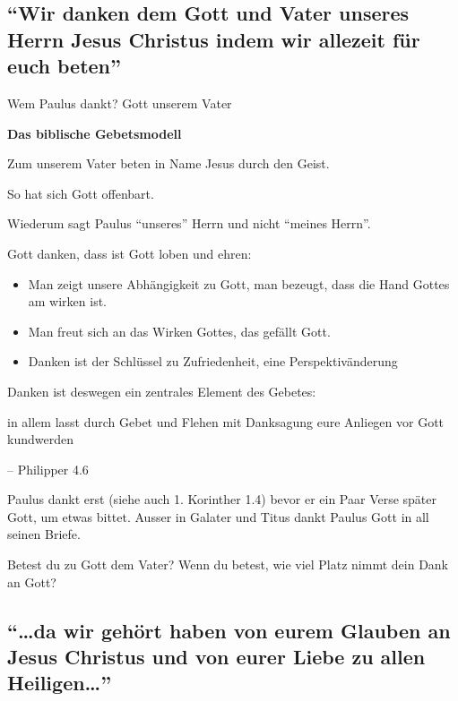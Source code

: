 \documentclass[
  12pt,
]{krantz}
\makeatletter
\providecommand{\tightlist}{%
  \setlength{\itemsep}{0pt}\setlength{\parskip}{0pt}}
\newenvironment{kframe}{%
\medskip{}
\setlength{\fboxsep}{.8em}
 \def\at@end@of@kframe{}%
 \ifinner\ifhmode%
  \def\at@end@of@kframe{\end{minipage}}%
  \begin{minipage}{\columnwidth}%
 \fi\fi%
 \def\FrameCommand##1{\hskip\@totalleftmargin \hskip-\fboxsep
 \colorbox{shadecolor}{##1}\hskip-\fboxsep
     \hskip-\linewidth \hskip-\@totalleftmargin \hskip\columnwidth}%
 \MakeFramed {\advance\hsize-\width
   \@totalleftmargin\z@ \linewidth\hsize
   \@setminipage}}%
 {\par\unskip\endMakeFramed%
 \at@end@of@kframe}
\newenvironment{rmdblock}[1]
  {
  \begin{itemize}
  \renewcommand{\labelitemi}{
    \raisebox{-.7\height}[0pt][0pt]{
      {\setkeys{Gin}{width=3em,keepaspectratio}\texttt{[image: img/\#1]}}
    }
  }
  \setlength{\fboxsep}{1em}
  \begin{kframe}
  \item
  }
  {
  \end{kframe}
  \end{itemize}
  }
\newenvironment{rmdquestion}
  {\begin{rmdblock}{question}}
  {\end{rmdblock}}
\newenvironment{rmdquote}
  {\begin{rmdblock}{quote}}
  {\end{rmdblock}}
\newenvironment{rmddefinition}
  {\begin{rmdblock}{definition}}
  {\end{rmdblock}}
\makeatother
\begin{document}
\hypertarget{wir-danken-dem-gott-und-vater-unseres-herrn-jesus-christus-indem-wir-allezeit-fuxfcr-euch-beten}{%
\subsection{``Wir danken dem Gott und Vater unseres Herrn Jesus Christus indem wir allezeit für euch beten''}\label{wir-danken-dem-gott-und-vater-unseres-herrn-jesus-christus-indem-wir-allezeit-fuxfcr-euch-beten}}

Wem Paulus dankt? Gott unserem Vater

\begin{rmddefinition}
\textbf{Das biblische Gebetsmodell}

Zum unserem Vater beten in Name Jesus durch den Geist.

So hat sich Gott offenbart.
\end{rmddefinition}

Wiederum sagt Paulus ``unseres'' Herrn und nicht ``meines Herrn''.

Gott danken, dass ist Gott loben und ehren:

\begin{itemize}
\tightlist
\item
  Man zeigt unsere Abhängigkeit zu Gott, man bezeugt, dass die Hand Gottes am wirken ist.
\item
  Man freut sich an das Wirken Gottes, das gefällt Gott.
\item
  Danken ist der Schlüssel zu Zufriedenheit, eine Perspektivänderung
\end{itemize}

Danken ist deswegen ein zentrales Element des Gebetes:

\begin{rmdquote}
in allem lasst durch Gebet und Flehen mit Danksagung eure Anliegen vor
Gott kundwerden

-- Philipper 4.6
\end{rmdquote}

Paulus dankt erst (siehe auch 1. Korinther 1.4) bevor er ein Paar Verse später Gott, um etwas bittet. Ausser in Galater und Titus dankt Paulus Gott in all seinen Briefe.

\begin{rmdquestion}
Betest du zu Gott dem Vater? Wenn du betest, wie viel Platz nimmt dein
Dank an Gott?
\end{rmdquestion}

\hypertarget{da-wir-gehuxf6rt-haben-von-eurem-glauben-an-jesus-christus-und-von-eurer-liebe-zu-allen-heiligen}{%
\subsection{\texorpdfstring{``\ldots da wir gehört haben von eurem Glauben an Jesus Christus und von eurer Liebe zu allen Heiligen\ldots{}''}{``\ldots da wir gehört haben von eurem Glauben an Jesus Christus und von eurer Liebe zu allen Heiligen\ldots''}}\label{da-wir-gehuxf6rt-haben-von-eurem-glauben-an-jesus-christus-und-von-eurer-liebe-zu-allen-heiligen}}
\end{document}
